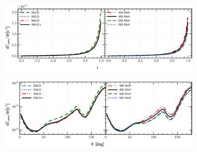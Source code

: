     \begin{figure}[h]
        \begin{center}
        \includegraphics[width=0.9\textwidth]{PlotData/PION/Dalitz_maps/figures/3HE_dGdr.pdf}
        \end{center}
        \caption{}
        \label{pion_dGdEr}
    \end{figure}

    \begin{figure}[h]
        \begin{center}
        \includegraphics[width=0.9\textwidth]{PlotData/PION/Dalitz_maps/figures/3HE_dGdphi.pdf}
        \end{center}
        \caption{}
        \label{pion_dGdphi}
    \end{figure}